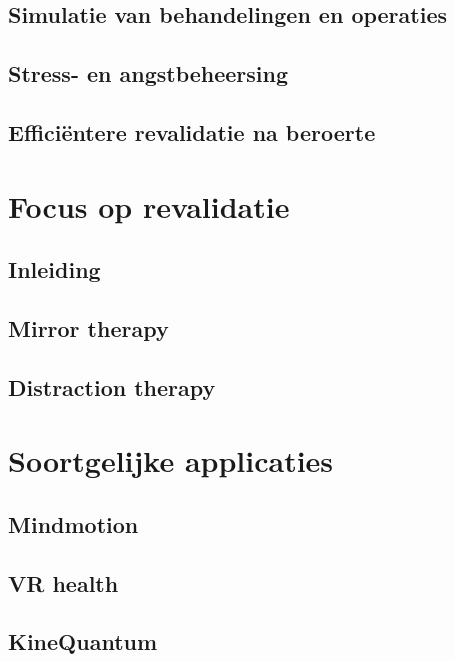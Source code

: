 \subsection{Simulatie van behandelingen en operaties}
\subsection{Stress- en angstbeheersing}  
\subsection{Efficiëntere revalidatie na beroerte}  

\section{Focus op revalidatie}
\subsection{Inleiding}
\subsection{Mirror therapy}
\subsection{Distraction therapy}

\section{Soortgelijke applicaties}
\subsection{Mindmotion}
\subsection{VR health}
\subsection{KineQuantum}

